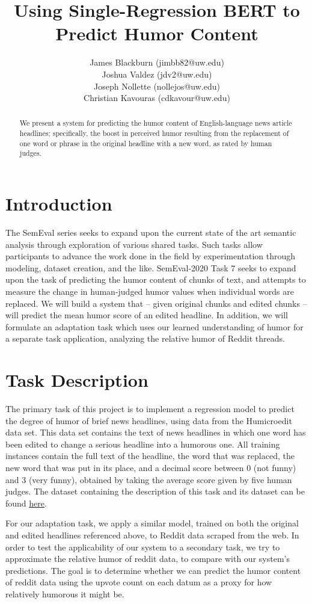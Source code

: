 \documentclass{article}
\title{Using Single-Regression BERT to Predict Humor Content}
\author{
James Blackburn (jimbb82@uw.edu)\\
Joshua Valdez (jdv2@uw.edu)\\
Joseph Nollette (nollejos@uw.edu)\\
Christian Kavouras (cdkavour@uw.edu)
}
\date{\vspace{-5ex}}
\begin{document}
\maketitle


\begin{abstract}
We present a system for predicting the humor content of English-language news article headlines; specifically, the boost in perceived humor resulting from the replacement of one word or phrase in the original headline with a new word, as rated by human judges.
\end{abstract}

\section{Introduction}
The SemEval series seeks to expand upon the current state of the art semantic analysis through exploration of various shared tasks. Such tasks allow participants to advance the work done in the field by experimentation through modeling, dataset creation, and the like. SemEval-2020 Task 7 seeks to expand upon the task of predicting the humor content of chunks of text, and attempts to measure the change in human-judged humor values when individual words are replaced. We will build a system that -- given original chunks and edited chunks -- will predict the mean humor score of an edited headline. In addition, we will formulate an adaptation task which uses our learned understanding of humor for a separate task application, analyzing the relative humor of Reddit threads.

\section{Task Description}
The primary task of this project is to implement a regression model to predict the degree of humor of brief news headlines, using data from the Humicroedit data set. This data set contains the text of news headlines in which one word has been edited to change a serious headline into a humorous one. All training instances contain the full text of the headline, the word that was replaced, the new word that was put in its place, and a decimal score between 0 (not funny) and 3 (very funny), obtained by taking the average score given by five human judges. The dataset containing the description of this task and its dataset can be found \href{https://competitions.codalab.org/competitions/20970}{here}.\cite{hossain-etal-2019-president}

For our adaptation task, we apply a similar model, trained on both the original and edited headlines referenced above, to Reddit data scraped from the web. In order to test the applicability of our system to a secondary task, we try to approximate the relative humor of reddit data, to compare with our system's predictions. The goal is to determine whether we can predict the humor content of reddit data using the upvote count on each datum as a proxy for how relatively humorous it might be.
\end{document}
